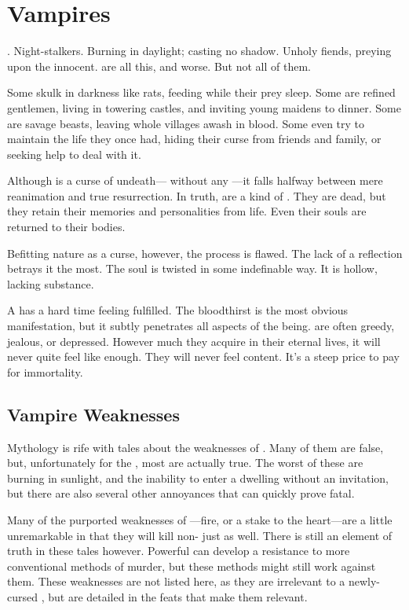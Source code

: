 \chapter{Vampires}

.
Night-stalkers.
Burning in daylight; casting no shadow.
Unholy fiends, preying upon the innocent.
{\vampires} are all this, and worse.
But not all of them.

Some skulk in darkness like rats, feeding while their prey sleep.
Some are refined gentlemen, living in towering castles, and inviting young maidens to dinner.
Some are savage beasts, leaving whole villages awash in blood.
Some even try to maintain the life they once had, hiding their curse from friends and family, or seeking help to deal with it.

Although {\vampirism} is a curse of undeath--- without any ---it falls halfway between mere reanimation and true resurrection.
In truth, {\vampires} are a kind of .
They are dead, but they retain their memories and personalities from life.
Even their souls are returned to their bodies.

Befitting {\vampirismpossessive} nature as a curse, however, the process is flawed.
The lack of a reflection betrays it the most.
The {\vampirepossessive} soul is twisted in some indefinable way.
It is hollow, lacking substance.

A {\vampire} has a hard time feeling fulfilled.
The bloodthirst is the most obvious manifestation, but it subtly penetrates all aspects of the {\vampirepossessive} being.
{\vampires} are often greedy, jealous, or depressed.
However much they acquire in their eternal lives, it will never quite feel like enough.
They will never feel content.
It's a steep price to pay for immortality.

\section{Vampire Weaknesses}

Mythology is rife with tales about the weaknesses of {\vampires}.
Many of them are false, but, unfortunately for the {\vampires}, most are actually true.
The worst of these are burning in sunlight, and the inability to enter a dwelling without an invitation, but there are also several other annoyances that can quickly prove fatal.

Many of the purported weaknesses of {\vampires}---fire, or a stake to the heart---are a little unremarkable in that they will kill non-{\vampires} just as well.
There is still an element of truth in these tales however.
Powerful {\vampires} can develop a resistance to more conventional methods of murder, but these methods might still work against them.
These weaknesses are not listed here, as they are irrelevant to a newly-cursed {\vampire}, but are detailed in the feats that make them relevant.

